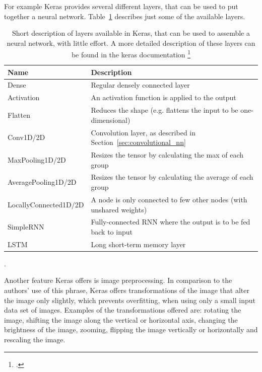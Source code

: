 For example Keras provides several different layers, that can be used to put together a neural network. Table~\ref{tab:methodology_tensorflow_alternativesToTensorflow_kerasLayers} describes just some of the available layers.

\begin{center}
	\begin{table}[h!]
		\begin{tabular}{| l | l |}
			\hline
			\bfseries Name & \bfseries Description \\
			\hline
			Dense & Regular densely connected layer \\
			\hline
			Activation & An activation function is applied to the output \\
			\hline
			Flatten & Reduces the shape (e.g. flattens the input to be one-dimensional) \\
			\hline
			Conv1D/2D & Convolution layer, as described in Section~\ref{sec:convolutional_nn} \\
			\hline
			MaxPooling1D/2D & Resizes the tensor by calculating the max of each group \\
			\hline
			AveragePooling1D/2D & Resizes the tensor by calculating the average of each group \\
			\hline
			LocallyConnected1D/2D & A node is only connected to few other nodes (with unshared weights) \\
			SimpleRNN & Fully-connected RNN where the output is to be fed back to input \\
			LSTM & Long short-term memory layer \\
			\hline
		\end{tabular}
		\caption{Short description of layers available in Keras, that can be used to assemble a neural network, with little effort. A more detailed description of these layers can be found in the keras documentation \footcite{kerasDocumentation}}.
		\label{tab:methodology_tensorflow_alternativesToTensorflow_kerasLayers}
	\end{table}
\end{center}

Another feature Keras offers is image preprocessing. In comparison to the authors' use of this phrase, Keras offers transformations of the image that alter the image only slightly, which prevents overfitting, when using only a small input data set of images. Examples of the transformations offered are: rotating the image, shifting the image along the vertical or horizontal axis, changing the brightness of the image, zooming, flipping the image vertically or horizontally and rescaling the image.

